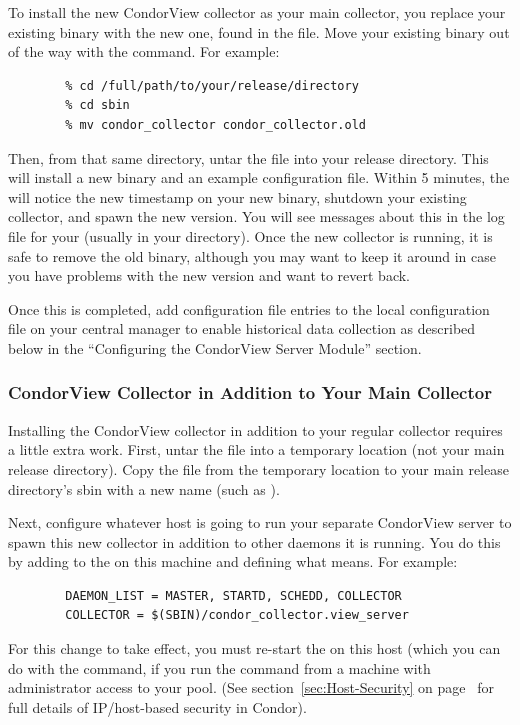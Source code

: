 To install the new CondorView collector as your main collector, you
replace your existing binary with the new one, found in
the  file.
Move your existing 
binary out of the way with the  command.
For example:
\begin{verbatim}
        % cd /full/path/to/your/release/directory
        % cd sbin
        % mv condor_collector condor_collector.old
\end{verbatim}
Then, from that same directory, untar the
 file into your release directory.
This will
install a new  binary and an example
configuration file.
Within 5 minutes, the  will notice the new timestamp on
your new  binary, shutdown your existing
collector, and spawn the new version.
You will see messages about this in the log file for your
 (usually  in your 
directory).
Once the new collector is running, it is safe to remove the old
binary, although you may want to keep it around in case you have
problems with the new version and want to revert back.

Once this is completed, add configuration file entries
to the local configuration file on your central manager to enable historical
data collection as
described below in the ``Configuring the CondorView Server 
Module'' section.

\subsubsection{\label{sec:CondorView-Server-Both}
CondorView Collector in Addition to Your Main Collector} 

Installing the CondorView collector in addition to your regular
collector requires a little extra work.
First, untar the  file into a
temporary location (not your main release directory).
Copy the  file from the temporary location
to your main release directory's sbin with a new name (such as
).

Next, configure whatever host is going to run your separate
CondorView server to spawn this new collector in addition to
other daemons it is running.
You do this by adding  to the  on
this machine and defining what  means.
For example:
\begin{verbatim}
        DAEMON_LIST = MASTER, STARTD, SCHEDD, COLLECTOR
        COLLECTOR = $(SBIN)/condor_collector.view_server
\end{verbatim}
For this change to take effect, you must re-start the
 on this host (which you can do with the
 command, if you run the command from a machine with 
administrator access to your pool.
(See section~\ref{sec:Host-Security} on
page~\pageref{sec:Host-Security} for full details of IP/host-based
security in Condor).

